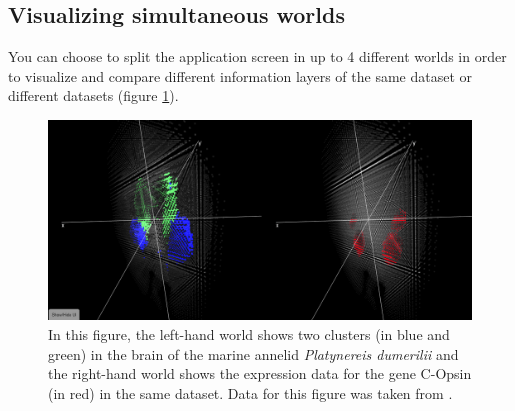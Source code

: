 \documentclass{bioinfo}
\begin{document}
\subsection{Visualizing simultaneous worlds}
You can choose to split the application screen in up to 4 different worlds in order to visualize and compare different information layers of the same dataset or different datasets (figure \ref{fig:01}).
\begin{figure}[h!]%
\centerline{\includegraphics[totalheight=0.19\textheight]{Supp_fig1.png}}
\caption{In this figure, the left-hand world shows two clusters (in blue and green) in the brain of the marine annelid {\it Platynereis dumerilii} and the right-hand world shows the expression data for the gene C-Opsin (in red) in the same dataset. Data for this figure was taken from \citep{Tomer10}.}\label{fig:01}
\end{figure}
\end{document}
